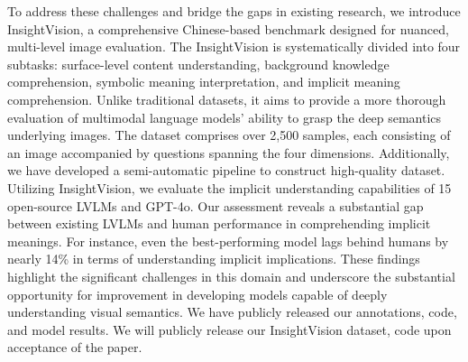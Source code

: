 To address these challenges and bridge the gaps in existing research, we introduce InsightVision, a comprehensive Chinese-based benchmark designed for nuanced, multi-level image evaluation. The InsightVision is systematically divided into four subtasks: surface-level content understanding, background knowledge comprehension, symbolic meaning interpretation, and implicit meaning comprehension. Unlike traditional datasets, it aims to provide a more thorough evaluation of multimodal language models' ability to grasp the deep semantics underlying images. The dataset comprises over 2,500 samples, each consisting of an image accompanied by questions spanning the four dimensions. Additionally, we have developed a semi-automatic pipeline to construct high-quality dataset. Utilizing InsightVision, we evaluate the implicit understanding capabilities of 15 open-source LVLMs and GPT-4o. Our assessment reveals a substantial gap between existing LVLMs and human performance in comprehending implicit meanings. For instance, even the best-performing model lags behind humans by nearly 14\% in terms of understanding implicit implications. These findings highlight the significant challenges in this domain and underscore the substantial opportunity for improvement in developing models capable of deeply understanding visual semantics. We have publicly released our annotations, code, and model results. We will publicly release our InsightVision dataset, code upon acceptance of the paper.

 